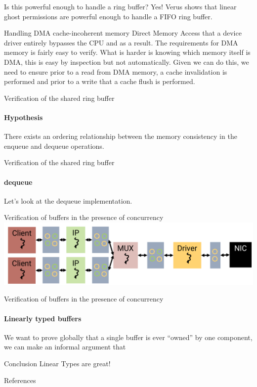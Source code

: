 \documentclass[aspectratio=169]{beamer}
\begin{document}
  \begin{frame}{Is this powerful enough to handle a ring buffer?}
    Yes! Verus shows that linear ghost permissions are powerful enough to handle a FIFO ring buffer. 
  \end{frame}

  \begin{frame}{Handling DMA cache-incoherent memory}
    Direct Memory Access that a device driver entirely bypasses the CPU and as a result. 
    The requirements for DMA memory is fairly easy to verify. What is harder is knowing which memory itself is DMA, this is easy by inspection but not automatically.
    Given we can do this, we need to ensure prior to a read from DMA memory, a cache invalidation is performed and prior to a write that a cache flush is performed.
  \end{frame}
  
  \begin{frame}{Verification of the shared ring buffer}
    \framesubtitle{Hypothesis}
    There exists an ordering relationship between the memory consistency in the enqueue and dequeue operations. 
  \end{frame}

  \begin{frame}{Verification of the shared ring buffer}
    \framesubtitle{dequeue}
    Let's look at the dequeue implementation. 
  \end{frame}

  \begin{frame}{Verification of buffers in the presence of concurrency}
    \includegraphics[width=\textwidth]{sddf_detail} 
  \end{frame}

  \begin{frame}{Verification of buffers in the presence of concurrency}
    \framesubtitle{Linearly typed buffers}
    We want to prove globally that a single buffer is ever ``owned'' by one component, 
    we can make an informal argument that 
  \end{frame}

  \begin{frame}{Conclusion}
    Linear Types are great!
  \end{frame}

  \begin{frame}[allowframebreaks]{References}
    
    \nocite{*}
    
  \end{frame}
\end{document}
